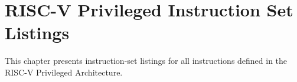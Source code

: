 \chapter{RISC-V Privileged Instruction Set Listings}

This chapter presents instruction-set listings for all instructions
defined in the RISC-V Privileged Architecture.


